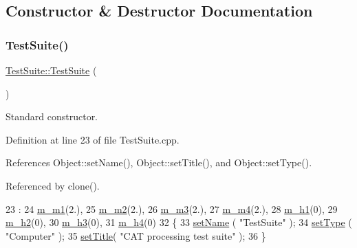 \subsection{Constructor \& Destructor Documentation}
\mbox{\label{classTestSuite_af7291e6d8b53443604ee0c1fcf1fadfc}} 
\subsubsection{\texorpdfstring{Test\+Suite()}{TestSuite()}}
{\footnotesize\ttfamily \hyperlink{classTestSuite_1_1TestSuite}{Test\+Suite\+::\+Test\+Suite} (\begin{DoxyParamCaption}{ }\end{DoxyParamCaption})}



Standard constructor. 



Definition at line 23 of file Test\+Suite.\+cpp.



References Object\+::set\+Name(), Object\+::set\+Title(), and Object\+::set\+Type().



Referenced by clone().


\begin{DoxyCode}
23                        :
24   \hyperlink{classTestSuite_a853a92fd3e82371d19993739c2bf1236}{m\_m1}(2.),
25   \hyperlink{classTestSuite_a710aa6029d3d0b47b61a828a472f7546}{m\_m2}(2.),
26   \hyperlink{classTestSuite_acbc062956d67a5f47dfb74286a390300}{m\_m3}(2.),
27   \hyperlink{classTestSuite_ac3d39b72dd5fce4c48eb39ea56be3e36}{m\_m4}(2.),
28   \hyperlink{classTestSuite_a8691ed6da0262d0e09d512b58375f94c}{m\_h1}(0),
29   \hyperlink{classTestSuite_ad08c4828466d73e1273408ecd3547baf}{m\_h2}(0),
30   \hyperlink{classTestSuite_a86ca996cbb37caad3bcc32a138737e27}{m\_h3}(0),
31   \hyperlink{classTestSuite_a86739625b47a8ce6ebe2d7fb9f5128e3}{m\_h4}(0)
32 \{
33   \hyperlink{classObject_ae30fea75683c2d149b6b6d17c09ecd0c}{setName} ( \textcolor{stringliteral}{"TestSuite"} );
34   \hyperlink{classObject_aae534cc9d982bcb9b99fd505f2e103a5}{setType} ( \textcolor{stringliteral}{"Computer"} );
35   \hyperlink{classObject_a89557dbbad5bcaa02652f5d7fa35d20f}{setTitle}( \textcolor{stringliteral}{"CAT processing test suite"} );  
36 \}
\end{DoxyCode}
\mbox{\label{classTestSuite_af55b4cff7d5856cd9399980e168ebc3e}} 
